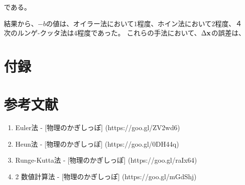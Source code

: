 \documentclass[11pt]{jsarticle}
\newcommand{\xb}{{\bf x}}
\begin{document}
            である。
            
            結果から、$-b$の値は、オイラー法において$1$程度、ホイン法において$2$程度、４次のルンゲ-クッタ法は$4$程度であった。
            これらの手法において、$\Delta \xb$の誤差は、


    \section{付録}

    \section{参考文献}
        \begin{enumerate}
            \item Euler法 - [物理のかぎしっぽ] (https://goo.gl/ZV2wd6)
            \item Heun法 - [物理のかぎしっぽ] (https://goo.gl/0DH44q)
            \item Runge-Kutta法 - [物理のかぎしっぽ] (https://goo.gl/raIx64)
            \item 2 数値計算法 - [物理のかぎしっぽ] (https://goo.gl/mGdShj)
        \end{enumerate}
\end{document}
